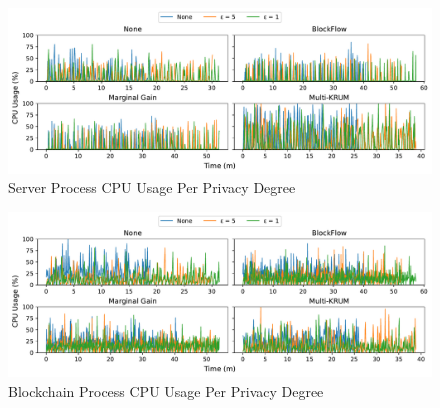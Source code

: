 \begin{figure}[!h]
    \centering
    \includegraphics[width=\textwidth]{graphics/privacy/cpu_server.pdf}
    \caption{Server Process CPU Usage Per Privacy Degree}
    \label{fig:cpu_privacy_servers}
\end{figure}

\begin{figure}[!h]
    \centering
    \includegraphics[width=\textwidth]{graphics/privacy/cpu_miner.pdf}
    \caption{Blockchain Process CPU Usage Per Privacy Degree}
    \label{fig:cpu_privacy_miners}
\end{figure}

